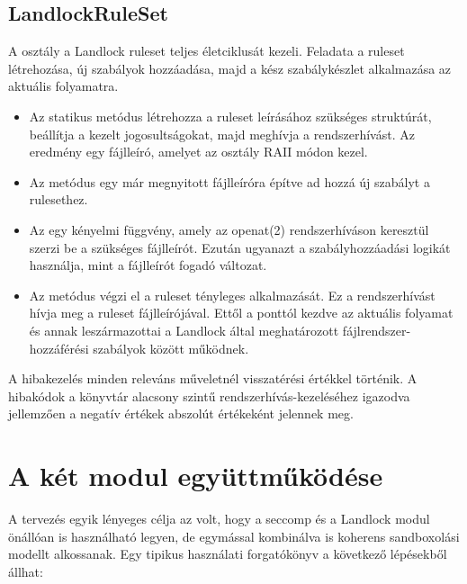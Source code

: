 \subsection{LandlockRuleSet}

A  osztály a Landlock ruleset teljes életciklusát
kezeli. Feladata a ruleset létrehozása, új szabályok hozzáadása, majd a kész
szabálykészlet alkalmazása az aktuális folyamatra.

\begin{itemize}
  \item Az  statikus metódus létrehozza a ruleset leírásához
  szükséges struktúrát, beállítja a kezelt
  jogosultságokat, majd meghívja a 
  rendszerhívást. Az eredmény egy
  fájlleíró, amelyet az osztály RAII módon kezel.

  \item Az  metódus egy már
  megnyitott fájlleíróra építve ad hozzá új szabályt a rulesethez.

  \item Az  egy
  kényelmi függvény, amely az openat(2) rendszerhíváson keresztül szerzi be a
  szükséges fájlleírót. Ezután ugyanazt a szabályhozzáadási logikát használja,
  mint a fájlleírót fogadó változat.

  \item Az  metódus végzi el a ruleset tényleges alkalmazását.
  Ez a  rendszerhívást
  hívja meg a ruleset
  fájlleírójával. Ettől a ponttól kezdve az aktuális folyamat és annak
  leszármazottai a Landlock által meghatározott fájlrendszer-hozzáférési
  szabályok között működnek.
\end{itemize}

A hibakezelés minden releváns műveletnél
 visszatérési értékkel történik. A hibakódok a
könyvtár alacsony szintű rendszerhívás-kezeléséhez igazodva jellemzően a
negatív  értékek abszolút értékeként jelennek meg.

\section{A két modul együttműködése}

A tervezés egyik lényeges célja az volt, hogy a seccomp és a Landlock modul
önállóan is használható legyen, de egymással kombinálva is koherens
sandboxolási modellt alkossanak. Egy tipikus használati forgatókönyv a
következő lépésekből állhat:

